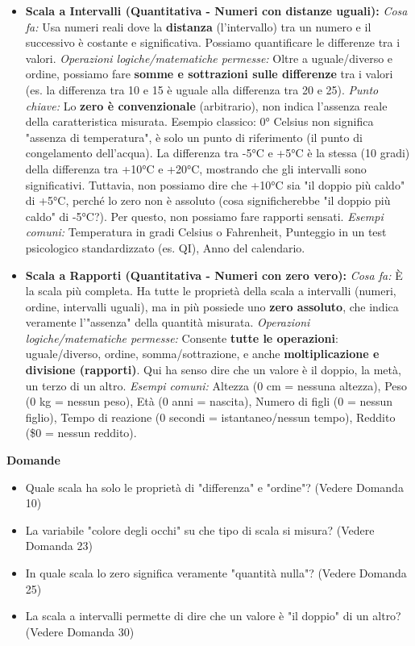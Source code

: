 \documentclass[12pt, a4paper]{article}
\newenvironment{reflectionbox}{%
    \medskip %
    \begin{framed}\par\noindent
    \textbf{\color{boxtitlecolor}Domande} \par
    \begin{itemize}[leftmargin=*, label=$\blacktriangleright$]
}{%
    \end{itemize}\par
    \end{framed}
    \medskip %
}
\begin{document}
\begin{itemize}
\begin{itemize}
            \item \textbf{Scala a Intervalli (Quantitativa - Numeri con distanze uguali):}
                \subitem \textit{Cosa fa:} Usa numeri reali dove la \textbf{distanza} (l'intervallo) tra un numero e il successivo è costante e significativa. Possiamo quantificare le differenze tra i valori.
                \subitem \textit{Operazioni logiche/matematiche permesse:} Oltre a uguale/diverso e ordine, possiamo fare \textbf{somme e sottrazioni sulle differenze} tra i valori (es. la differenza tra 10 e 15 è uguale alla differenza tra 20 e 25).
                \subitem \textit{Punto chiave:} Lo \textbf{zero è convenzionale} (arbitrario), non indica l'assenza reale della caratteristica misurata. Esempio classico: 0° Celsius non significa "assenza di temperatura", è solo un punto di riferimento (il punto di congelamento dell'acqua). La differenza tra -5°C e +5°C è la stessa (10 gradi) della differenza tra +10°C e +20°C, mostrando che gli intervalli sono significativi. Tuttavia, non possiamo dire che +10°C sia "il doppio più caldo" di +5°C, perché lo zero non è assoluto (cosa significherebbe "il doppio più caldo" di -5°C?). Per questo, non possiamo fare rapporti sensati.
                \subitem \textit{Esempi comuni:} Temperatura in gradi Celsius o Fahrenheit, Punteggio in un test psicologico standardizzato (es. QI), Anno del calendario.

            \item \textbf{Scala a Rapporti (Quantitativa - Numeri con zero vero):}
                \subitem \textit{Cosa fa:} È la scala più completa. Ha tutte le proprietà della scala a intervalli (numeri, ordine, intervalli uguali), ma in più possiede uno \textbf{zero assoluto}, che indica veramente l'"assenza" della quantità misurata.
                \subitem \textit{Operazioni logiche/matematiche permesse:} Consente \textbf{tutte le operazioni}: uguale/diverso, ordine, somma/sottrazione, e anche \textbf{moltiplicazione e divisione (rapporti)}. Qui ha senso dire che un valore è il doppio, la metà, un terzo di un altro.
                \subitem \textit{Esempi comuni:} Altezza (0 cm = nessuna altezza), Peso (0 kg = nessun peso), Età (0 anni = nascita), Numero di figli (0 = nessun figlio), Tempo di reazione (0 secondi = istantaneo/nessun tempo), Reddito (\$0 = nessun reddito).
        \end{itemize}
\end{itemize}

\begin{reflectionbox}
    \item Quale scala ha solo le proprietà di "differenza" e "ordine"? (Vedere Domanda 10)
    \item La variabile "colore degli occhi" su che tipo di scala si misura? (Vedere Domanda 23)
    \item In quale scala lo zero significa veramente "quantità nulla"? (Vedere Domanda 25)
    \item La scala a intervalli permette di dire che un valore è "il doppio" di un altro? (Vedere Domanda 30)
\end{reflectionbox}
\end{document}
